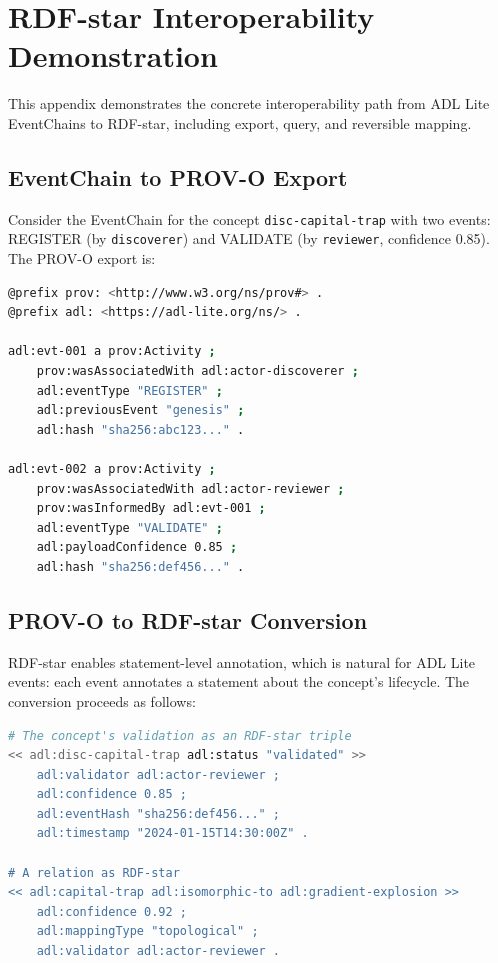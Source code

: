\section{RDF-star Interoperability Demonstration}\label{app:rdf-star}

This appendix demonstrates the concrete interoperability path from ADL Lite EventChains to RDF-star, including export, query, and reversible mapping.

\subsection{EventChain to PROV-O Export}

Consider the EventChain for the concept \texttt{disc-capital-trap} with two events: REGISTER (by \texttt{discoverer}) and VALIDATE (by \texttt{reviewer}, confidence 0.85). The PROV-O export is:

\begin{lstlisting}[language=bash]
@prefix prov: <http://www.w3.org/ns/prov#> .
@prefix adl: <https://adl-lite.org/ns/> .

adl:evt-001 a prov:Activity ;
    prov:wasAssociatedWith adl:actor-discoverer ;
    adl:eventType "REGISTER" ;
    adl:previousEvent "genesis" ;
    adl:hash "sha256:abc123..." .

adl:evt-002 a prov:Activity ;
    prov:wasAssociatedWith adl:actor-reviewer ;
    prov:wasInformedBy adl:evt-001 ;
    adl:eventType "VALIDATE" ;
    adl:payloadConfidence 0.85 ;
    adl:hash "sha256:def456..." .
\end{lstlisting}

\subsection{PROV-O to RDF-star Conversion}

RDF-star enables statement-level annotation, which is natural for ADL Lite events: each event annotates a statement about the concept's lifecycle. The conversion proceeds as follows:

\begin{lstlisting}[language=bash]
# The concept's validation as an RDF-star triple
<< adl:disc-capital-trap adl:status "validated" >>
    adl:validator adl:actor-reviewer ;
    adl:confidence 0.85 ;
    adl:eventHash "sha256:def456..." ;
    adl:timestamp "2024-01-15T14:30:00Z" .

# A relation as RDF-star
<< adl:capital-trap adl:isomorphic-to adl:gradient-explosion >>
    adl:confidence 0.92 ;
    adl:mappingType "topological" ;
    adl:validator adl:actor-reviewer .
\end{lstlisting}

